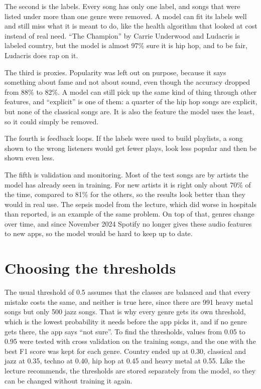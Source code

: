 \documentclass[11pt,a4paper]{article}
\begin{document}
The second is the labels. Every song has only one label, and songs that were listed under more than one genre were removed. A model can fit its labels well and still miss what it is meant to do, like the health algorithm that looked at cost instead of real need. \enquote{The Champion} by Carrie Underwood and Ludacris is labeled country, but the model is almost 97\% sure it is hip hop, and to be fair, Ludacris does rap on it.

The third is proxies. Popularity was left out on purpose, because it says something about fame and not about sound, even though the accuracy dropped from 88\% to 82\%. A model can still pick up the same kind of thing through other features, and \enquote{explicit} is one of them: a quarter of the hip hop songs are explicit, but none of the classical songs are. It is also the feature the model uses the least, so it could simply be removed.

The fourth is feedback loops. If the labels were used to build playlists, a song shown to the wrong listeners would get fewer plays, look less popular and then be shown even less.

The fifth is validation and monitoring. Most of the test songs are by artists the model has already seen in training. For new artists it is right only about 70\% of the time, compared to 81\% for the others, so the results look better than they would in real use. The sepsis model from the lecture, which did worse in hospitals than reported, is an example of the same problem. On top of that, genres change over time, and since November 2024 Spotify no longer gives these audio features to new apps, so the model would be hard to keep up to date.

\section{Choosing the thresholds}

The usual threshold of 0.5 assumes that the classes are balanced and that every mistake costs the same, and neither is true here, since there are 991 heavy metal songs but only 500 jazz songs. That is why every genre gets its own threshold, which is the lowest probability it needs before the app picks it, and if no genre gets there, the app says \enquote{not sure}. To find the thresholds, values from 0.05 to 0.95 were tested with cross validation on the training songs, and the one with the best F1 score was kept for each genre. Country ended up at 0.30, classical and jazz at 0.35, techno at 0.40, hip hop at 0.45 and heavy metal at 0.55. Like the lecture recommends, the thresholds are stored separately from the model, so they can be changed without training it again.
\end{document}
